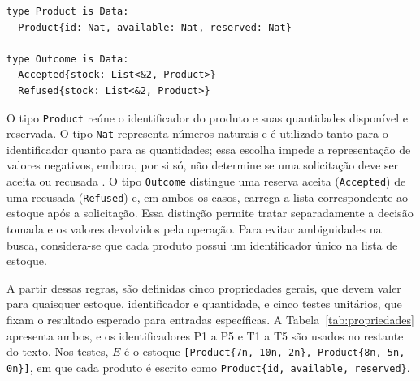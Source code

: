 \begin{lstlisting}[caption={Tipos de dados do estoque.},label={lst:tipos}]
type Product is Data:
  Product{id: Nat, available: Nat, reserved: Nat}

type Outcome is Data:
  Accepted{stock: List<&2, Product>}
  Refused{stock: List<&2, Product>}
\end{lstlisting}

O tipo \texttt{Product} reúne o identificador do produto e suas quantidades disponível e reservada. O tipo \texttt{Nat} representa números naturais e é utilizado tanto para o identificador quanto para as quantidades; essa escolha impede a representação de valores negativos, embora, por si só, não determine se uma solicitação deve ser aceita ou recusada \cite{BendGuide}. O tipo \texttt{Outcome} distingue uma reserva aceita (\texttt{Accepted}) de uma recusada (\texttt{Refused}) e, em ambos os casos, carrega a lista correspondente ao estoque após a solicitação. Essa distinção permite tratar separadamente a decisão tomada e os valores devolvidos pela operação. Para evitar ambiguidades na busca, considera-se que cada produto possui um identificador único na lista de estoque.

A partir dessas regras, são definidas cinco propriedades gerais, que devem valer para quaisquer estoque, identificador e quantidade, e cinco testes unitários, que fixam o resultado esperado para entradas específicas. A Tabela~\ref{tab:propriedades} apresenta ambos, e os identificadores P1 a P5 e T1 a T5 são usados no restante do texto. Nos testes, $E$ é o estoque \texttt{[Product\{7n, 10n, 2n\}, Product\{8n, 5n, 0n\}]}, em que cada produto é escrito como \texttt{Product\{id, available, reserved\}}.

